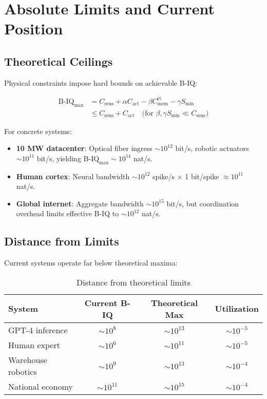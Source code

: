 \documentclass[10pt,conference]{IEEEtran}
\begin{document}
\section{Absolute Limits and Current Position}
\label{sec:limits}

\subsection{Theoretical Ceilings}
\label{sec:ceilings}

Physical constraints impose hard bounds on achievable B-IQ:

\begin{align}
\text{B-IQ}_{\max} &= C_{\text{sens}} + \alpha C_{\text{act}} - \beta C_{\text{mem}}^{\text{rt}} - \gamma S_{\min} \nonumber\\
&\leq C_{\text{sens}} + C_{\text{act}} \quad \text{(for } \beta, \gamma S_{\min} \ll C_{\text{sens}}\text{)}
\end{align}

For concrete systems:
\begin{itemize}
\item \textbf{10 MW datacenter}: Optical fiber ingress $\sim 10^{12}$ bit/s, robotic actuators $\sim 10^{11}$ bit/s, yielding $\text{B-IQ}_{\max} \sim 10^{14}$ nat/s.
\item \textbf{Human cortex}: Neural bandwidth $\sim 10^{12}$ spike/s $\times$ 1 bit/spike $\approx 10^{11}$ nat/s.
\item \textbf{Global internet}: Aggregate bandwidth $\sim 10^{15}$ bit/s, but coordination overhead limits effective B-IQ to $\sim 10^{12}$ nat/s.
\end{itemize}

\subsection{Distance from Limits}
\label{sec:distance}

Current systems operate far below theoretical maxima:

\begin{table}[!ht]
\centering\footnotesize
\caption{Distance from theoretical limits}
\label{tab:limits}
\begin{tabular}{lccc}
\hline
System & Current B-IQ & Theoretical Max & Utilization \\
\hline
GPT-4 inference & $\sim 10^8$ & $\sim 10^{13}$ & $\sim 10^{-5}$ \\
Human expert & $\sim 10^6$ & $\sim 10^{11}$ & $\sim 10^{-5}$ \\
Warehouse robotics & $\sim 10^9$ & $\sim 10^{13}$ & $\sim 10^{-4}$ \\
National economy & $\sim 10^{11}$ & $\sim 10^{15}$ & $\sim 10^{-4}$ \\
\hline
\end{tabular}
\end{table}
\end{document}
